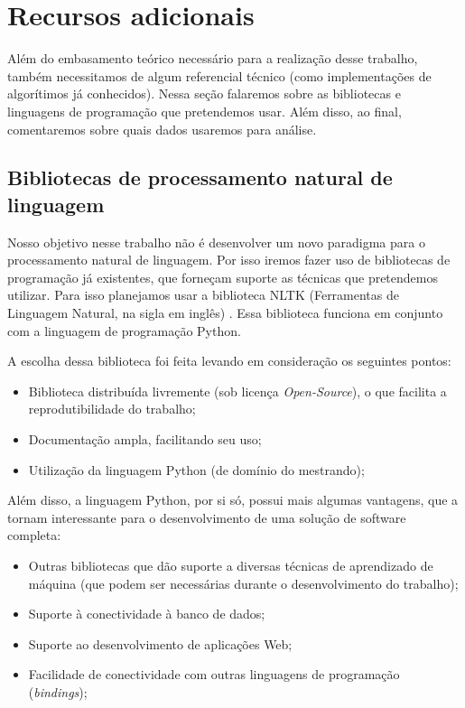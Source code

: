 \documentclass[
	12pt,				%
	openright,			%
	twoside,			%
	a4paper,			%
	english,			%
	spanish,			%
	brazil,				%
	]{abntex2}
\begin{document}
\section{Recursos adicionais}
Além do embasamento teórico necessário para a realização desse trabalho, também necessitamos de algum referencial técnico (como implementações de algorítimos já conhecidos). Nessa seção falaremos sobre as bibliotecas e linguagens de programação que pretendemos usar. Além disso, ao final, comentaremos sobre quais dados usaremos para análise.

\subsection{Bibliotecas de processamento natural de linguagem}

Nosso objetivo nesse trabalho não é desenvolver um novo paradigma para o processamento natural de linguagem. Por isso iremos fazer uso de bibliotecas de programação já existentes, que forneçam suporte as técnicas que pretendemos utilizar. Para isso planejamos usar a biblioteca NLTK (Ferramentas de Linguagem Natural, na sigla em inglês) \cite{bird2009natural}. Essa biblioteca funciona em conjunto com a linguagem de programação Python.

A escolha dessa biblioteca foi feita levando em consideração os seguintes pontos:

\begin{itemize}
	\item Biblioteca distribuída livremente (sob licença \emph{Open-Source}), o que facilita a reprodutibilidade do trabalho;
	\item Documentação ampla, facilitando seu uso;
	\item Utilização da linguagem Python (de domínio do mestrando);
\end{itemize}

Além disso, a linguagem Python, por si só, possui mais algumas vantagens, que a tornam interessante para o desenvolvimento de uma solução de software completa:

\begin{itemize}
	\item Outras bibliotecas que dão suporte a diversas técnicas de aprendizado de máquina (que podem ser necessárias durante o desenvolvimento do trabalho);
	\item Suporte à conectividade à banco de dados;
	\item Suporte ao desenvolvimento de aplicações Web;
	\item Facilidade de conectividade com outras linguagens de programação (\emph{bindings});
\end{itemize}
\end{document}

